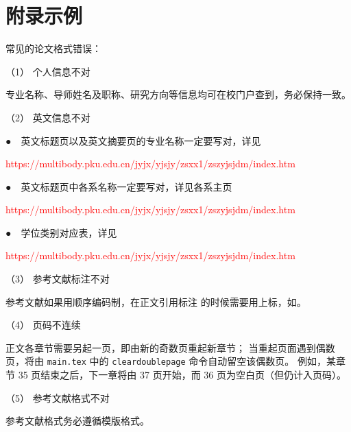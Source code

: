 \chapter{附录示例}
\label{appendix:first}
常见的论文格式错误：

（1） 个人信息不对

专业名称、导师姓名及职称、研究方向等信息均可在校门户查到，务必保持一致。

（2） 英文信息不对

●　英文标题页以及英文摘要页的专业名称一定要写对，详见

\textcolor{red}{https://multibody.pku.edu.cn/jyjx/yjsjy/zsxx1/zszyjsjdm/index.htm}

●　英文标题页中各系名称一定要写对，详见各系主页

\textcolor{red}{https://multibody.pku.edu.cn/jyjx/yjsjy/zsxx1/zszyjsjdm/index.htm}

●　学位类别对应表，详见

\textcolor{red}{https://multibody.pku.edu.cn/jyjx/yjsjy/zsxx1/zszyjsjdm/index.htm}

（3） 参考文献标注不对

参考文献如果用顺序编码制，在正文引用标注\cite{Reference_authors_Chinese,Reference_translated_Chinese} 的时候需要用上标，如\cite{Reference_authors_Chinese}。

（4） 页码不连续

正文各章节需要另起一页，即由新的奇数页重起新章节；
当重起页面遇到偶数页，将由 \texttt{main.tex} 中的 \texttt{cleardoublepage} 命令自动留空该偶数页。
例如，某章节 35 页结束之后，下一章将由 37 页开始，而 36 页为空白页（但仍计入页码）。

（5） 参考文献格式不对

参考文献格式务必遵循模版格式。